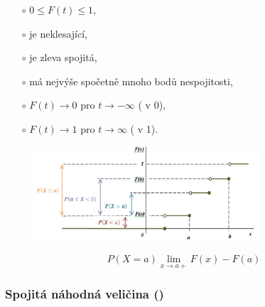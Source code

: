 \begin{itemize}
\begin{itemize}
				\begin{itemize}
					\item[$\circ$] $0 \leq F(t) \leq 1$,
					\item[$\circ$] je neklesající,
					\item[$\circ$] je zleva spojitá,
					\item[$\circ$] má nejvýše spočetně mnoho bodů nespojitosti,
					\item[$\circ$] $F(t) \rightarrow 0 $ pro $ t \rightarrow -\infty $ ( v 0),
					\item[$\circ$] $F(t) \rightarrow 1 $ pro $ t \rightarrow \infty $ ( v 1).
				\end{itemize}
				\begin{figure}[H]
					\centering
					\includegraphics[width=0.75\textwidth]{assets/11_vztah_prav_dist_dnv2}
				\end{figure}
				$$P(X = a) \lim_{x \to a+} F(x) - F(a)$$
			\end{itemize}
	\end{itemize}

\subsubsection{Spojitá náhodná veličina ()}

